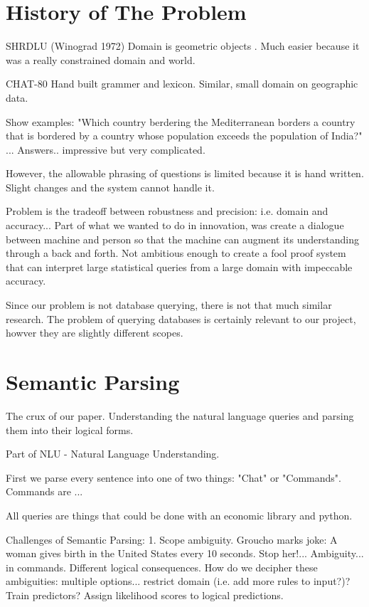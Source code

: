 \documentclass[pageno]{jpaper}
\begin{document}
\section{History of The Problem}

SHRDLU (Winograd 1972)
Domain is geometric objects .
Much easier because it was a really constrained domain and world.

CHAT-80
Hand built grammer and lexicon.
Similar, small domain on geographic data.

Show examples:
"Which country berdering the Mediterranean borders a country that is bordered by a country whose population exceeds the population of India?"
...
Answers.. impressive but very complicated.

However, the allowable phrasing of questions is limited because it is hand written. Slight changes and the system cannot handle it.

 Problem is the tradeoff between robustness and precision: i.e. domain and accuracy... Part of what we wanted to do in innovation, was create a dialogue between machine and person so that the machine can augment its understanding through a back and forth. Not ambitious enough to create a fool proof system that can interpret large statistical queries from a large domain with  impeccable accuracy.
 
 Since our problem is not database querying, there is not that much similar research. The problem of querying databases is certainly relevant to our project, howver they are slightly different scopes. 

\section{Semantic Parsing}
The crux of our paper. Understanding the natural language queries and parsing them into their logical forms.

Part of NLU - Natural Language Understanding. 

First we parse every sentence into one of two things:  "Chat" or "Commands". Commands are ...

All queries are things that could be done with an economic library and python. 


Challenges of Semantic Parsing:
1. Scope ambiguity. Groucho marks joke: A woman gives birth in the United States every 10 seconds. Stop her!... Ambiguity... in commands. Different logical consequences. How do we decipher these ambiguities: multiple options... restrict domain (i.e. add more rules to input?)? Train predictors? Assign likelihood scores to logical predictions. 
\end{document}
